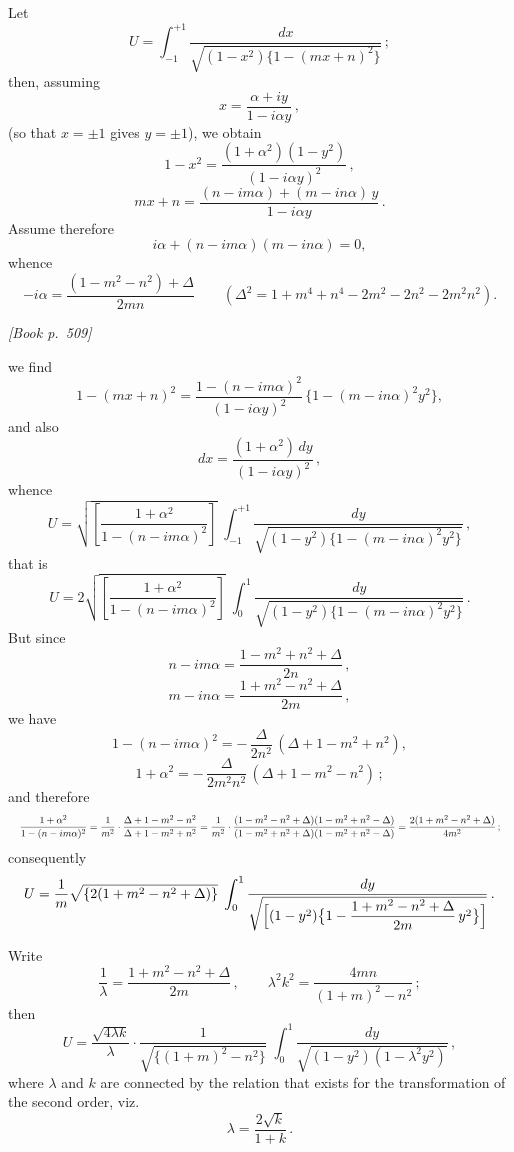 \documentclass[11pt]{article}
\begin{document}
\medskip

Let
\[
U = \int_{-1}^{+1} \frac{dx}{\sqrt{(1-x^{2})\{1-(m x + n)^{2}\}}}\,;
\]
then, assuming
\[
x = \frac{\alpha + i y}{1 - i \alpha y}\,,
\]
(so that $x = \pm 1$ gives $y = \pm 1$), we obtain
\[
1 - x^{2} = \frac{(1 + \alpha^{2})(1 - y^{2})}{(1 - i \alpha y)^{2}}\,,
\]
\[
m x + n = \frac{(n - i m \alpha) + (m - i n \alpha)\,y}{1 - i \alpha y}\,.
\]
Assume therefore
\[
i \alpha + (n - i m \alpha)(m - i n \alpha) = 0,
\]
whence
\[
-i \alpha = \frac{(1 - m^{2} - n^{2}) + \Delta}{2 m n}\qquad (\Delta^{2} = 1 + m^{4} + n^{4} - 2 m^{2} - 2 n^{2} - 2 m^{2} n^{2}).
\]

\medskip
\noindent\textit{[Book p.~509]}\hfill

\smallskip

\noindent we find
\[
1 - (m x + n)^{2} = \frac{1 - (n - i m \alpha)^{2}}{(1 - i \alpha y)^{2}}\,\bigl\{1 - (m - i n \alpha)^{2} y^{2}\bigr\},
\]
and also
\[
dx = \frac{(1 + \alpha^{2})\,dy}{(1 - i \alpha y)^{2}}\,,
\]
whence
\[
U = \sqrt{\!\left[\frac{1 + \alpha^{2}}{1 - (n - i m \alpha)^{2}}\right]}\;\int_{-1}^{+1} \frac{dy}{\sqrt{(1 - y^{2})\{1 - (m - i n \alpha)^{2} y^{2}\}}}\,,
\]
that is
\[
U = 2 \sqrt{\!\left[\frac{1 + \alpha^{2}}{1 - (n - i m \alpha)^{2}}\right]}\;\int_{0}^{1} \frac{dy}{\sqrt{(1 - y^{2})\{1 - (m - i n \alpha)^{2} y^{2}\}}}\,.
\]
But since
\[
n - i m \alpha = \frac{1 - m^{2} + n^{2} + \Delta}{2 n}\,,
\]
\[
m - i n \alpha = \frac{1 + m^{2} - n^{2} + \Delta}{2 m}\,,
\]
we have
\[
1 - (n - i m \alpha)^{2} = -\,\frac{\Delta}{2 n^{2}}\,(\Delta + 1 - m^{2} + n^{2}),
\]
\[
1 + \alpha^{2} = -\,\frac{\Delta}{2 m^{2} n^{2}}\,(\Delta + 1 - m^{2} - n^{2})\,;
\]
and therefore
\[ \resizebox{\textwidth}{!}{$\displaystyle
\frac{1 + \alpha^{2}}{1 - (n - i m \alpha)^{2}} = \frac{1}{m^{2}}\cdot\frac{\Delta + 1 - m^{2} - n^{2}}{\Delta + 1 - m^{2} + n^{2}}
= \frac{1}{m^{2}}\cdot\frac{(1 - m^{2} - n^{2} + \Delta)(1 - m^{2} + n^{2} - \Delta)}{(1 - m^{2} + n^{2} + \Delta)(1 - m^{2} + n^{2} - \Delta)} = \frac{2(1 + m^{2} - n^{2} + \Delta)}{4 m^{2}}\,;
$} \]
consequently
\[
U = \frac{1}{m}\sqrt{\{2(1 + m^{2} - n^{2} + \Delta)\}}\;\int_{0}^{1} \frac{dy}{\sqrt{\Bigl[(1 - y^{2})\bigl\{1 - \dfrac{1 + m^{2} - n^{2} + \Delta}{2 m}\, y^{2}\bigr\}\Bigr]}}\,.
\]

Write
\[
\frac{1}{\lambda} = \frac{1 + m^{2} - n^{2} + \Delta}{2 m}\,,\qquad \lambda^{2} k^{2} = \frac{4 m n}{(1 + m)^{2} - n^{2}}\,;
\]
then
\[
U = \frac{\sqrt{4\lambda k}}{\lambda}\cdot\frac{1}{\sqrt{\{(1 + m)^{2} - n^{2}\}}}\;\int_{0}^{1} \frac{dy}{\sqrt{(1 - y^{2})(1 - \lambda^{2} y^{2})}}\,,
\]
where $\lambda$ and $k$ are connected by the relation that exists for the transformation of the second order, viz.\
\[
\lambda = \frac{2\sqrt{k}}{1 + k}\,.
\]
\end{document}

